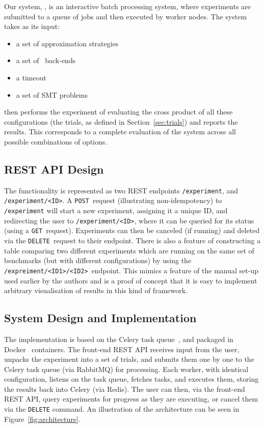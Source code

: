 \documentclass[a4paper]{IEEEtran}
\begin{document}
Our system, \testbench{}, is an interactive batch processing system,
where experiments are submitted to a queue of jobs and then executed
by worker nodes. The system takes as its input:
\begin{itemize}
  \item a set of approximation strategies
  \item a set of \uppsat{}\ back-ends
  \item a timeout
  \item a set of SMT problems
\end{itemize}
\testbench{} then performs the experiment of evaluating the cross product of all
these configurations (the trials, as defined in Section~\ref{sec:trials})
and reports the results. This corresponds to a complete evaluation of the system
across all possible combinations of options. 

\subsection{REST API Design}

The functionality is represented as two REST endpoints
\texttt{/experiment}, and \texttt{/experiment/<ID>}. A
\texttt{POST}~request (illustrating non-idempotency) to
\texttt{/experiment} will start a new experiment, assigning it a
unique ID, and redirecting the user to \texttt{/experiment/<ID>},
where it can be queried for its status (using a
\texttt{GET}~request). Experiments can then be canceled (if running)
and deleted via the \texttt{DELETE}~request to their endpoint. There
is also a feature of constructing a table comparing two different
experiments which are running on the same set of benchmarks (but with
different configurations) by using the
\texttt{/expreiment/<ID1>/<ID2>}~endpoint. This mimics a feature of
the manual set-up used earlier by the authors and is a proof of
concept that it is easy to implement arbitrary visualisation of
results in this kind of framework.

\subsection{System Design and Implementation}
The implementation is based on the Celery task queue~\cite{celery}, and packaged
in Docker~\cite{docker} containers. The front-end REST API receives input from
the user, unpacks the experiment into a set of trials, and submits them one
by one to the Celery task queue (via RabbitMQ) for processing. Each worker, with
identical configuration, listens on the task queue, fetches tasks, and executes
them, storing the results back into Celery (via Redis). The user can then, via
the front-end REST API, query experiments for progress as they are executing, or
cancel them via the \texttt{DELETE} command. An illustration of the architecture
can be seen in Figure~\ref{fig:architecture}.
\end{document}
